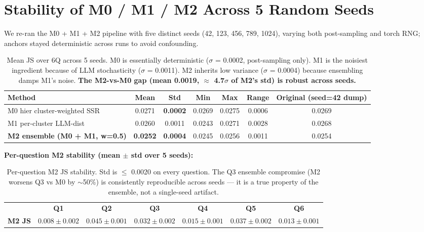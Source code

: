 \documentclass[10pt,a4paper]{article}
\newcommand{\good}[1]{\textcolor{green!50!black}{\textbf{#1}}}
\begin{document}
\section{Stability of M0 / M1 / M2 Across 5 Random Seeds}

We re-ran the M0 + M1 + M2 pipeline with five distinct seeds (42, 123, 456, 789, 1024), varying both post-sampling and torch RNG; anchors stayed deterministic across runs to avoid confounding.

\begin{table}[H]
\centering
\small
\begin{tabular}{l c c c c c c}
\toprule
\textbf{Method} & \textbf{Mean} & \textbf{Std} & \textbf{Min} & \textbf{Max} & \textbf{Range} & \textbf{Original (seed=42 dump)} \\
\midrule
M0 hier cluster-weighted SSR & 0.0271 & \good{0.0002} & 0.0269 & 0.0275 & 0.0006 & 0.0269 \\
M1 per-cluster LLM-dist      & 0.0260 & 0.0011 & 0.0243 & 0.0271 & 0.0028 & 0.0268 \\
\rowcolor{m2row}
\textbf{M2 ensemble (M0 + M1, w=0.5)} & \good{0.0252} & \good{0.0004} & 0.0245 & 0.0256 & 0.0011 & 0.0254 \\
\bottomrule
\end{tabular}
\caption{Mean JS over 6Q across 5 seeds. M0 is essentially deterministic ($\sigma$ = 0.0002, post-sampling only). M1 is the noisiest ingredient because of LLM stochasticity ($\sigma$ = 0.0011). M2 inherits low variance ($\sigma$ = 0.0004) because ensembling damps M1's noise. \textbf{The M2-vs-M0 gap (mean 0.0019, $\approx$ 4.7$\sigma$ of M2's std) is robust across seeds.}}
\end{table}

\textbf{Per-question M2 stability (mean $\pm$ std over 5 seeds):}

\begin{table}[H]
\centering
\small
\begin{tabular}{l c c c c c c}
\toprule
& \textbf{Q1} & \textbf{Q2} & \textbf{Q3} & \textbf{Q4} & \textbf{Q5} & \textbf{Q6} \\
\textbf{M2 JS} & $0.008 \pm 0.002$ & $0.045 \pm 0.001$ & $0.032 \pm 0.002$ & $0.015 \pm 0.001$ & $0.037 \pm 0.002$ & $0.013 \pm 0.001$ \\
\bottomrule
\end{tabular}
\caption{Per-question M2 JS stability. Std is $\le$ 0.0020 on every question. The Q3 ensemble compromise (M2 worsens Q3 vs M0 by $\sim$50\%) is consistently reproducible across seeds — it is a true property of the ensemble, not a single-seed artifact.}
\end{table}
\end{document}
